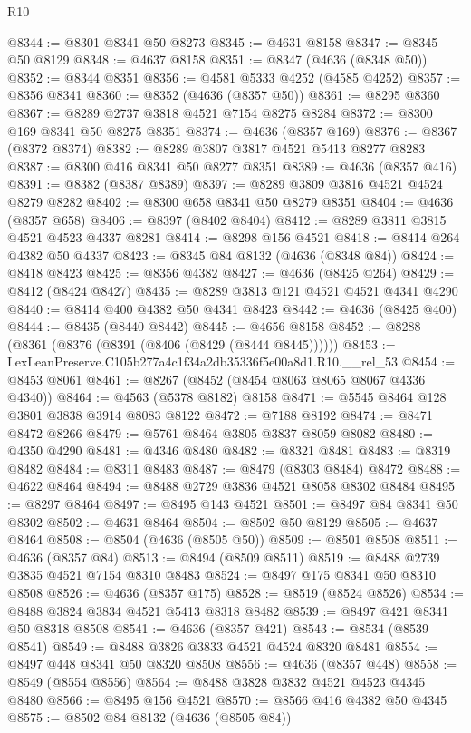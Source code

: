 \begin{lexlean}{R10}
\begin{coremodule}
@8344 := @8301 @8341 @50 @8273
@8345 := @4631 @8158
@8347 := @8345 @50 @8129
@8348 := @4637 @8158
@8351 := @8347 (@4636 (@8348 @50))
@8352 := @8344 @8351
@8356 := @4581 @5333 @4252 (@4585 @4252)
@8357 := @8356 @8341
@8360 := @8352 (@4636 (@8357 @50))
@8361 := @8295 @8360
@8367 := @8289 @2737 @3818 @4521 @7154 @8275 @8284
@8372 := @8300 @169 @8341 @50 @8275 @8351
@8374 := @4636 (@8357 @169)
@8376 := @8367 (@8372 @8374)
@8382 := @8289 @3807 @3817 @4521 @5413 @8277 @8283
@8387 := @8300 @416 @8341 @50 @8277 @8351
@8389 := @4636 (@8357 @416)
@8391 := @8382 (@8387 @8389)
@8397 := @8289 @3809 @3816 @4521 @4524 @8279 @8282
@8402 := @8300 @658 @8341 @50 @8279 @8351
@8404 := @4636 (@8357 @658)
@8406 := @8397 (@8402 @8404)
@8412 := @8289 @3811 @3815 @4521 @4523 @4337 @8281
@8414 := @8298 @156 @4521
@8418 := @8414 @264 @4382 @50 @4337
@8423 := @8345 @84 @8132 (@4636 (@8348 @84))
@8424 := @8418 @8423
@8425 := @8356 @4382
@8427 := @4636 (@8425 @264)
@8429 := @8412 (@8424 @8427)
@8435 := @8289 @3813 @121 @4521 @4521 @4341 @4290
@8440 := @8414 @400 @4382 @50 @4341 @8423
@8442 := @4636 (@8425 @400)
@8444 := @8435 (@8440 @8442)
@8445 := @4656 @8158
@8452 := @8288 (@8361 (@8376 (@8391 (@8406 (@8429 (@8444 @8445))))))
@8453 := LexLeanPreserve.C105b277a4c1f34a2db35336f5e00a8d1.R10.__rel_53
@8454 := @8453 @8061
@8461 := @8267 (@8452 (@8454 @8063 @8065 @8067 @4336 @4340))
@8464 := @4563 (@5378 @8182) @8158
@8471 := @5545 @8464 @128 @3801 @3838 @3914 @8083 @8122
@8472 := @7188 @8192
@8474 := @8471 @8472 @8266
@8479 := @5761 @8464 @3805 @3837 @8059 @8082
@8480 := @4350 @4290
@8481 := @4346 @8480
@8482 := @8321 @8481
@8483 := @8319 @8482
@8484 := @8311 @8483
@8487 := @8479 (@8303 @8484) @8472
@8488 := @4622 @8464
@8494 := @8488 @2729 @3836 @4521 @8058 @8302 @8484
@8495 := @8297 @8464
@8497 := @8495 @143 @4521
@8501 := @8497 @84 @8341 @50 @8302
@8502 := @4631 @8464
@8504 := @8502 @50 @8129
@8505 := @4637 @8464
@8508 := @8504 (@4636 (@8505 @50))
@8509 := @8501 @8508
@8511 := @4636 (@8357 @84)
@8513 := @8494 (@8509 @8511)
@8519 := @8488 @2739 @3835 @4521 @7154 @8310 @8483
@8524 := @8497 @175 @8341 @50 @8310 @8508
@8526 := @4636 (@8357 @175)
@8528 := @8519 (@8524 @8526)
@8534 := @8488 @3824 @3834 @4521 @5413 @8318 @8482
@8539 := @8497 @421 @8341 @50 @8318 @8508
@8541 := @4636 (@8357 @421)
@8543 := @8534 (@8539 @8541)
@8549 := @8488 @3826 @3833 @4521 @4524 @8320 @8481
@8554 := @8497 @448 @8341 @50 @8320 @8508
@8556 := @4636 (@8357 @448)
@8558 := @8549 (@8554 @8556)
@8564 := @8488 @3828 @3832 @4521 @4523 @4345 @8480
@8566 := @8495 @156 @4521
@8570 := @8566 @416 @4382 @50 @4345
@8575 := @8502 @84 @8132 (@4636 (@8505 @84))

\end{coremodule}
\end{lexlean}
